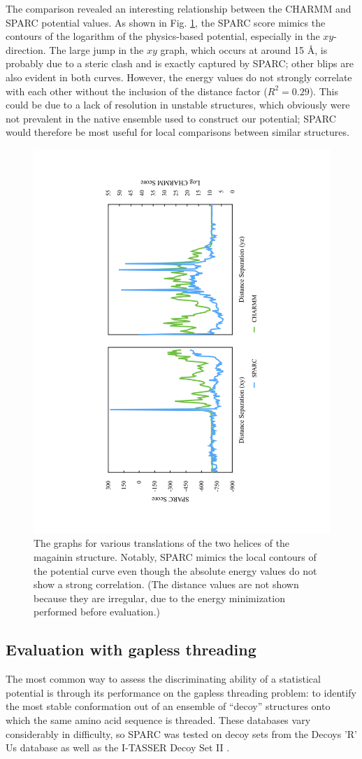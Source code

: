 \documentclass[11pt,titlepage]{article}
\begin{document}
The comparison revealed an interesting relationship between the CHARMM and SPARC potential values.
As shown in Fig. \ref{magainin_graphs}, the SPARC score mimics the contours of the logarithm of the physics-based potential, especially in the $xy$-direction.
The large jump in the $xy$ graph, which occurs at around 15 \AA, is probably due to a steric clash and is exactly captured by SPARC; other blips are also evident in both curves.
However, the energy values do not strongly correlate with each other without the inclusion of the distance factor ($R^2=0.29$). 
This could be due to a lack of resolution in unstable structures, which obviously were not prevalent in the native ensemble used to construct our potential; SPARC would therefore be most useful for local comparisons between similar structures.

\begin{figure}
	\includegraphics[height=0.9\textwidth, angle=-90, trim=5cm 0 5cm 3cm]{magainin_graphs}
	\caption{The graphs for various translations of the two helices of the magainin structure. Notably, SPARC mimics the local contours of the potential curve even though the absolute energy values do not show a strong correlation. (The distance values are not shown because they are irregular, due to the energy minimization performed before evaluation.)}
	\label{magainin_graphs}
\end{figure}

\subsection{Evaluation with gapless threading}
The most common way to assess the discriminating ability of a statistical potential is through its performance on the gapless threading problem: to identify the most stable conformation out of an ensemble of ``decoy'' structures onto which the same amino acid sequence is threaded.
These databases vary considerably in difficulty, so SPARC was tested on decoy sets from the Decoys 'R' Us database \cite{samudrala} as well as the I-TASSER Decoy Set II \cite{zhang}.
\end{document}
